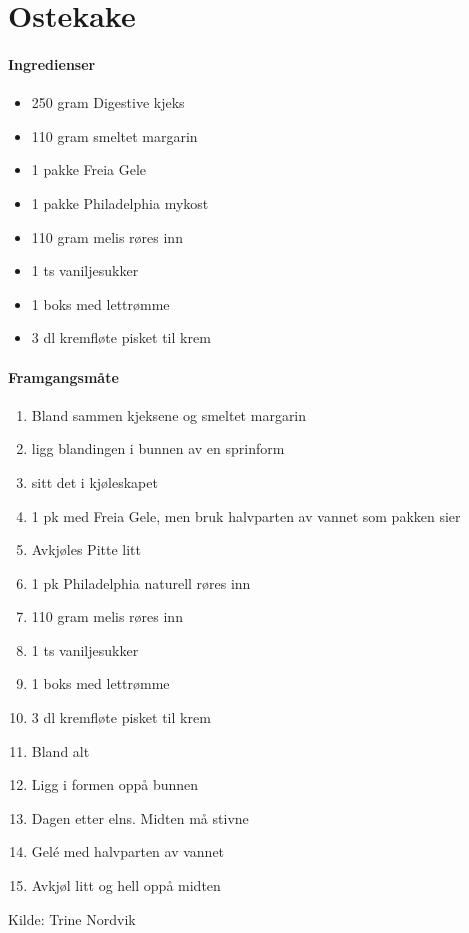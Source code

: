 \section{Ostekake}


\paragraph{Ingredienser}
\begin{itemize}[noitemsep]
	\item 250 gram Digestive kjeks
	\item 110 gram smeltet margarin
	\item 1 pakke Freia Gele
	\item 1 pakke Philadelphia mykost
	\item 110 gram melis røres inn
	\item 1 ts vaniljesukker
	\item 1 boks med lettrømme
	\item 3 dl kremfløte pisket til krem
\end{itemize}

\paragraph{Framgangsmåte}
\begin{enumerate}[noitemsep]
	\item Bland sammen kjeksene og smeltet margarin
	\item ligg blandingen i bunnen av en sprinform
	\item sitt det i kjøleskapet
	\item 1 pk med Freia Gele, men bruk halvparten av vannet som pakken sier
	\item Avkjøles Pitte litt
	\item 1 pk Philadelphia naturell røres inn
	\item 110 gram melis røres inn
	\item 1 ts vaniljesukker
	\item 1 boks med lettrømme
	\item 3 dl kremfløte pisket til krem
	\item Bland alt
	\item Ligg i formen oppå bunnen
	\item Dagen etter elns.  Midten må stivne
	\item Gelé med halvparten av vannet
	\item Avkjøl litt og hell oppå midten
\end{enumerate}

Kilde: Trine Nordvik
